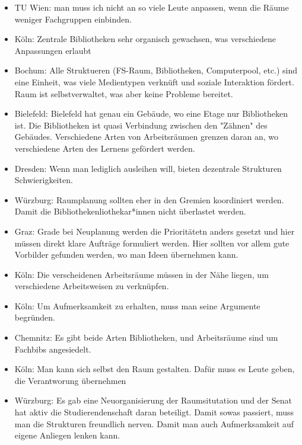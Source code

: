\begin{itemize}
      \item TU Wien: man muss ich nicht an so viele Leute anpassen, wenn die Räume weniger Fachgruppen einbinden.

      \item Köln: Zentrale Bibliotheken sehr organisch gewachsen, was verschiedene Anpassungen erlaubt

      \item Bochum: Alle Struktueren (FS-Raum, Bibliotheken, Computerpool, etc.) sind eine Einheit, was viele Medientypen verknüft und soziale Interaktion fördert. Raum ist selbstverwaltet, was aber keine Probleme bereitet.

      \item Bielefeld: Bielefeld hat genau ein Gebäude, wo eine Etage nur Bibliotheken ist. Die Bibliotheken ist quasi Verbindung zwischen den "Zähnen" des Gebäudes. Verschiedene Arten von Arbeitsräumen grenzen daran an, wo verschiedene Arten des Lernens gefördert werden.

      \item Dresden: Wenn man lediglich ausleihen will, bieten dezentrale Strukturen Schwierigkeiten.

      \item Würzburg: Raumplanung sollten eher in den Gremien koordiniert werden. Damit die Bibliothekenliothekar*innen nicht überlastet werden.

      \item Graz: Grade bei Neuplanung werden die Prioritätetn anders gesetzt und hier müssen direkt klare Aufträge formuliert werden. Hier sollten vor allem gute Vorbilder gefunden werden, wo man Ideen übernehmen kann.

      \item Köln: Die verscheidenen Arbeitsräume müssen in der Nähe liegen, um verschiedene Arbeitsweisen zu verknüpfen.

      \item Köln: Um Aufmerksamkeit zu erhalten, muss man seine Argumente begründen.

      \item Chemnitz: Es gibt beide Arten Bibliotheken, und Arbeitsräume sind um Fachbibs angesiedelt.

      \item Köln: Man kann sich selbst den Raum gestalten. Dafür muss es Leute geben, die Verantworung übernehmen

      \item Würzburg: Es gab eine Neuorganisierung der Raumsitutation und der Senat hat aktiv die Studierendenschaft daran beteiligt. Damit sowas passiert, muss man die Strukturen freundlich nerven. Damit man auch Aufmerksamkeit auf eigene Anliegen lenken kann.


\end{itemize}
